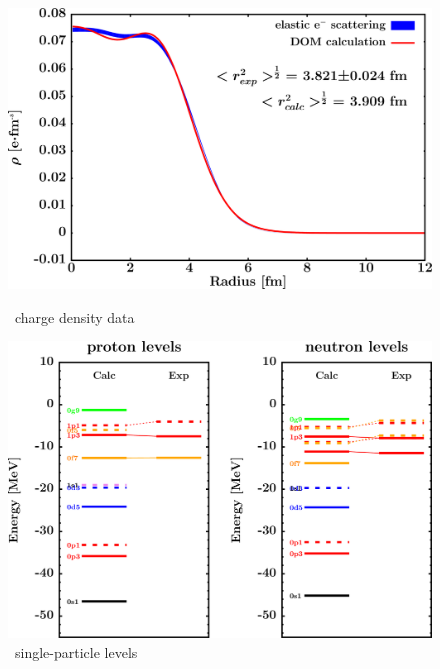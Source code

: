 \begin{figure}[H]
    \centering
    \begin{minipage}{0.45\textwidth}
        \centering
        \includegraphics[width=1.0\textwidth]{figures/ni64_chargeDensity.png}
        \caption{\niFour\ charge density data}
        \label{DOMFitData_ni64_chargeDensity}
    \end{minipage}\hfill
    \begin{minipage}{0.45\textwidth}
        \centering
        \includegraphics[width=1.0\textwidth]{figures/ni64_SPLevels.png}
        \caption{\niFour\ single-particle levels}
        \label{DOMFitData_ni64_SPLevels}
    \end{minipage}
\end{figure}

\afterpage{\clearpage}

